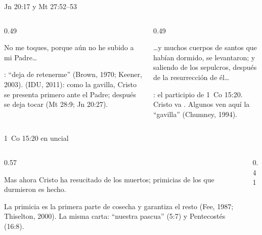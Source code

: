\begin{frame}{Jn 20:17 y Mt 27:52--53}
\begin{columns}[t,onlytextwidth]
\begin{column}{0.49\textwidth}
\begin{cita}No me toques, porque aún no he subido a mi Padre\ldots{}\end{cita}
\scriptsize\RaggedRight {}: ``deja de retenerme'' (Brown, 1970; Keener, 2003).  (IDU, 2011): como la gavilla, Cristo se presenta primero ante el Padre; después se deja tocar (Mt 28:9; Jn 20:27).
\end{column}
\begin{column}{0.49\textwidth}
\begin{cita}\ldots{}y muchos cuerpos de santos que habían dormido, se levantaron; y saliendo de los sepulcros, después de la resurrección de él\ldots{}\end{cita}
\scriptsize\RaggedRight {}: el participio de 1~Co 15:20. Cristo va . Algunos ven aquí la ``gavilla'' (Chumney, 1994).
\end{column}
\end{columns}\medskip
{}
\end{frame}

\begin{frame}{1~Co 15:20 en uncial}
\begin{columns}[c,onlytextwidth]
\begin{column}{0.57\textwidth}
\begin{cita}Mas ahora Cristo ha resucitado de los muertos; primicias de los que durmieron es hecho.\end{cita}
\small\RaggedRight {}\par\medskip
\scriptsize La primicia es la primera parte de  cosecha y garantiza el resto (Fee, 1987; Thiselton, 2000). La misma carta: ``nuestra pascua'' (5:7) y Pentecostés (16:8).
\end{column}
\begin{column}{0.41\textwidth}\end{column}
\end{columns}
\end{frame}

